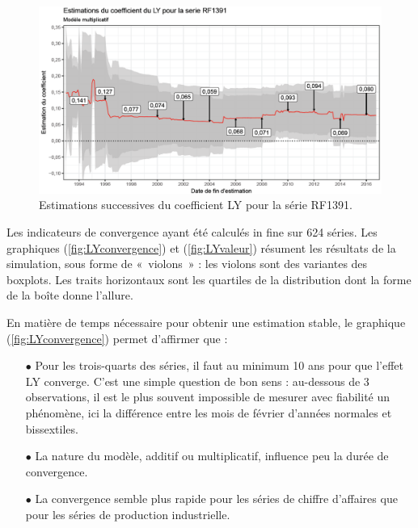 \documentclass[12pt, a4paper, french]{article}
\begin{document}
\begin{figure}[!ht]
\begin{center}
 \includegraphics[scale=0.50]{img/LYexemple2.png}
 \caption[Estimations successives du coefficient LY pour la série RF139]{Estimations successives du coefficient LY pour la série RF1391.}
 \label{fig:LYexemple2}
\end{center}
\end{figure}

Les indicateurs de convergence ayant été calculés in fine sur 624 séries. Les graphiques (\ref{fig:LYconvergence}) et (\ref{fig:LYvaleur}) résument les résultats de la simulation, sous forme de «~violons~» : les violons sont des variantes des boxplots. Les traits horizontaux sont les quartiles de la distribution dont la forme de la boîte donne l'allure. 

En matière de temps nécessaire pour obtenir une estimation stable, le graphique (\ref{fig:LYconvergence}) permet d'affirmer que :
\begin{itemize}
	\item[$\bullet$] Pour les trois-quarts des séries, il faut au minimum 10 ans pour que l'effet LY converge. C'est une simple question de bon sens : au-dessous de 3 observations, il est le plus souvent impossible de mesurer avec fiabilité un phénomène, ici la différence entre les mois de février d'années normales et bissextiles.
	\item[$\bullet$] La nature du modèle, additif ou multiplicatif, influence peu la durée de convergence.
	\item[$\bullet$] La convergence semble plus rapide pour les séries de chiffre d'affaires que pour les séries de production industrielle.
\end{itemize}
\end{document}
